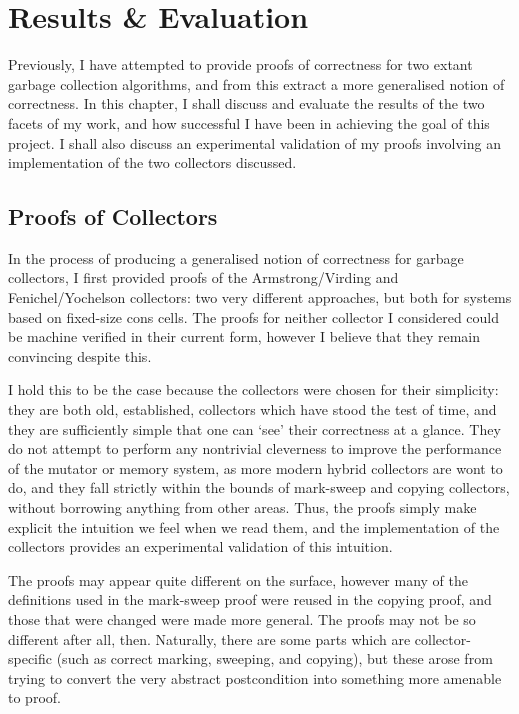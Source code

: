 \chapter{Results \& Evaluation}
\label{sec:results}

Previously, I have attempted to provide proofs of correctness for two
extant garbage collection algorithms, and from this extract a more
generalised notion of correctness. In this chapter, I shall discuss
and evaluate the results of the two facets of my work, and how
successful I have been in achieving the goal of this project. I shall
also discuss an experimental validation of my proofs involving an
implementation of the two collectors discussed.

\section{Proofs of Collectors}
\label{sec:results-collectors}

In the process of producing a generalised notion of correctness for
garbage collectors, I first provided proofs of the Armstrong/Virding
and Fenichel/Yochelson collectors: two very different approaches, but
both for systems based on fixed-size cons cells. The proofs for
neither collector I considered could be machine verified in their
current form, however I believe that they remain convincing despite
this.

I hold this to be the case because the collectors were chosen for
their simplicity: they are both old, established, collectors which
have stood the test of time, and they are sufficiently simple that one
can `see' their correctness at a glance. They do not attempt to
perform any nontrivial cleverness to improve the performance of the
mutator or memory system, as more modern hybrid collectors are wont to
do, and they fall strictly within the bounds of mark-sweep and copying
collectors, without borrowing anything from other areas. Thus, the
proofs simply make explicit the intuition we feel when we read them,
and the implementation of the collectors provides an experimental
validation of this intuition.

The proofs may appear quite different on the surface, however many of
the definitions used in the mark-sweep proof were reused in the
copying proof, and those that were changed were made more
general. The proofs may not be so different after all,
then. Naturally, there are some parts which are collector-specific
(such as correct marking, sweeping, and copying), but these arose from
trying to convert the very abstract postcondition into something more
amenable to proof.

